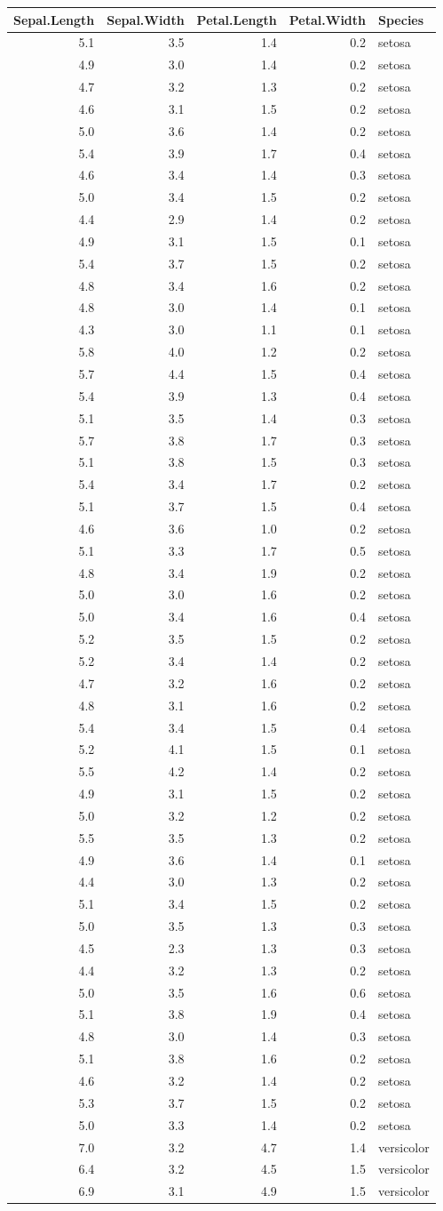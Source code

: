 \documentclass[
]{article}
\begin{document}
\begin{longtable}[]{@{}rrrrl@{}}
\toprule
Sepal.Length & Sepal.Width & Petal.Length & Petal.Width &
Species\tabularnewline
\midrule
\endhead
5.1 & 3.5 & 1.4 & 0.2 & setosa\tabularnewline
4.9 & 3.0 & 1.4 & 0.2 & setosa\tabularnewline
4.7 & 3.2 & 1.3 & 0.2 & setosa\tabularnewline
4.6 & 3.1 & 1.5 & 0.2 & setosa\tabularnewline
5.0 & 3.6 & 1.4 & 0.2 & setosa\tabularnewline
5.4 & 3.9 & 1.7 & 0.4 & setosa\tabularnewline
4.6 & 3.4 & 1.4 & 0.3 & setosa\tabularnewline
5.0 & 3.4 & 1.5 & 0.2 & setosa\tabularnewline
4.4 & 2.9 & 1.4 & 0.2 & setosa\tabularnewline
4.9 & 3.1 & 1.5 & 0.1 & setosa\tabularnewline
5.4 & 3.7 & 1.5 & 0.2 & setosa\tabularnewline
4.8 & 3.4 & 1.6 & 0.2 & setosa\tabularnewline
4.8 & 3.0 & 1.4 & 0.1 & setosa\tabularnewline
4.3 & 3.0 & 1.1 & 0.1 & setosa\tabularnewline
5.8 & 4.0 & 1.2 & 0.2 & setosa\tabularnewline
5.7 & 4.4 & 1.5 & 0.4 & setosa\tabularnewline
5.4 & 3.9 & 1.3 & 0.4 & setosa\tabularnewline
5.1 & 3.5 & 1.4 & 0.3 & setosa\tabularnewline
5.7 & 3.8 & 1.7 & 0.3 & setosa\tabularnewline
5.1 & 3.8 & 1.5 & 0.3 & setosa\tabularnewline
5.4 & 3.4 & 1.7 & 0.2 & setosa\tabularnewline
5.1 & 3.7 & 1.5 & 0.4 & setosa\tabularnewline
4.6 & 3.6 & 1.0 & 0.2 & setosa\tabularnewline
5.1 & 3.3 & 1.7 & 0.5 & setosa\tabularnewline
4.8 & 3.4 & 1.9 & 0.2 & setosa\tabularnewline
5.0 & 3.0 & 1.6 & 0.2 & setosa\tabularnewline
5.0 & 3.4 & 1.6 & 0.4 & setosa\tabularnewline
5.2 & 3.5 & 1.5 & 0.2 & setosa\tabularnewline
5.2 & 3.4 & 1.4 & 0.2 & setosa\tabularnewline
4.7 & 3.2 & 1.6 & 0.2 & setosa\tabularnewline
4.8 & 3.1 & 1.6 & 0.2 & setosa\tabularnewline
5.4 & 3.4 & 1.5 & 0.4 & setosa\tabularnewline
5.2 & 4.1 & 1.5 & 0.1 & setosa\tabularnewline
5.5 & 4.2 & 1.4 & 0.2 & setosa\tabularnewline
4.9 & 3.1 & 1.5 & 0.2 & setosa\tabularnewline
5.0 & 3.2 & 1.2 & 0.2 & setosa\tabularnewline
5.5 & 3.5 & 1.3 & 0.2 & setosa\tabularnewline
4.9 & 3.6 & 1.4 & 0.1 & setosa\tabularnewline
4.4 & 3.0 & 1.3 & 0.2 & setosa\tabularnewline
5.1 & 3.4 & 1.5 & 0.2 & setosa\tabularnewline
5.0 & 3.5 & 1.3 & 0.3 & setosa\tabularnewline
4.5 & 2.3 & 1.3 & 0.3 & setosa\tabularnewline
4.4 & 3.2 & 1.3 & 0.2 & setosa\tabularnewline
5.0 & 3.5 & 1.6 & 0.6 & setosa\tabularnewline
5.1 & 3.8 & 1.9 & 0.4 & setosa\tabularnewline
4.8 & 3.0 & 1.4 & 0.3 & setosa\tabularnewline
5.1 & 3.8 & 1.6 & 0.2 & setosa\tabularnewline
4.6 & 3.2 & 1.4 & 0.2 & setosa\tabularnewline
5.3 & 3.7 & 1.5 & 0.2 & setosa\tabularnewline
5.0 & 3.3 & 1.4 & 0.2 & setosa\tabularnewline
7.0 & 3.2 & 4.7 & 1.4 & versicolor\tabularnewline
6.4 & 3.2 & 4.5 & 1.5 & versicolor\tabularnewline
6.9 & 3.1 & 4.9 & 1.5 & versicolor\tabularnewline

\end{longtable}
\end{document}

